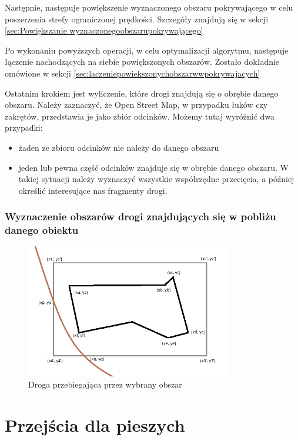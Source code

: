 Następnie, następuje powiększenie wyznaczonego obszaru pokrywającego w celu poszerzenia strefy ograniczonej prędkości. Szczegóły znajdują się w sekcji \ref{sec:Powiększanie wyznaczonegoobszarupokrywającego}

Po wykonaniu powyższych operacji, w celu optymalizacji algorytmu, następuje łączenie nachodzących na siebie powiększonych obszarów.  Zostało dokładnie omówione w sekcji \ref{sec:laczeniepowiekszonychobszarwwpokrywajacych}


Ostatnim krokiem jest wyliczenie, które drogi znajdują się o obrębie danego obszaru. Należy zaznaczyć, że Open Street Map, w przypadku łuków czy zakrętów, przedstawia je jako zbiór odcinków. Możemy tutaj wyróżnić dwa przypadki:
\begin{itemize}
\item żaden ze zbioru odcinków nie należy do danego obszaru
\item jeden lub pewna część odcinków znajduje się w obrębie danego obszaru. W takiej sytuacji należy wyznaczyć wszystkie współrzędne przecięcia, a później określić interesujące nas fragmenty drogi.
\end{itemize}




\subsubsection{Wyznaczenie obszarów drogi znajdujących się w pobliżu danego obiektu}



\newpage
\begin{figure}[h]
\caption{Droga przebiegająca przez wybrany obszar}
\label{sec:fourthBB}
\centering
\includegraphics[width=0.8\textwidth]{minBoundingBoxWay}
\end{figure}

\newpage
\section{Przejścia dla pieszych}
\label{sec:pedestrialCrossing}
